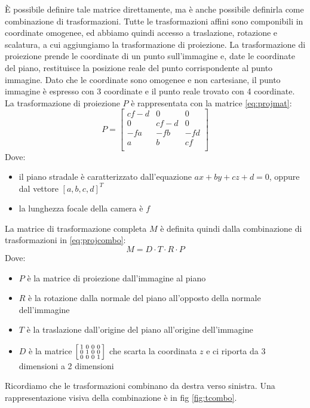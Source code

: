 È possibile definire tale matrice direttamente, ma è anche possibile definirla come combinazione di trasformazioni.
Tutte le trasformazioni affini sono componibili in coordinate omogenee, ed abbiamo quindi accesso a traslazione, rotazione e scalatura, a cui aggiungiamo la trasformazione di proiezione.
La trasformazione di proiezione prende le coordinate di un punto sull'immagine e, date le coordinate del piano, restituisce la posizione reale del punto corrispondente al punto immagine.
Dato che le coordinate sono omogenee e non cartesiane, il punto immagine è espresso con 3 coordinate e il punto reale trovato con 4 coordinate.
La trasformazione di proiezione $P$ è rappresentata con la matrice \ref{eq:projmat}:
\begin{equation}
        \label{eq:projmat}
        P = 
        \begin{bmatrix}
            cf - d & 0      & 0   \\
            0      & cf - d & 0   \\
            -fa    & -fb    & -fd \\
            a      & b      & cf  \\
        \end{bmatrix}
\end{equation}
Dove:
\begin{itemize}
    \item il piano stradale è caratterizzato dall'equazione $ax + by + cz + d = 0$, oppure dal vettore $[a, b, c, d]^T$
    \item la lunghezza focale della camera è $f$
\end{itemize}

La matrice di trasformazione completa $M$ è definita quindi dalla combinazione di trasformazioni in \ref{eq:projcombo}:
\begin{equation}
    \label{eq:projcombo}
    M = D \cdot T \cdot R \cdot P
\end{equation}
Dove:
\begin{itemize}
    \item $P$ è la matrice di proiezione dall'immagine al piano
    \item $R$ è la rotazione dalla normale del piano all'opposto della normale dell'immagine
    \item $T$ è la traslazione dall'origine del piano all'origine dell'immagine
    \item $D$ è la matrice 
    $
    \begin{bsmallmatrix}
        1 & 0 & 0 & 0 \\
        0 & 1 & 0 & 0 \\
        0 & 0 & 0 & 1 \\
    \end{bsmallmatrix}
    $
    che scarta la coordinata $z$ e ci riporta da 3 dimensioni a 2 dimensioni
\end{itemize}
Ricordiamo che le trasformazioni combinano da destra verso sinistra.
Una rappresentazione visiva della combinazione è in fig \ref{fig:tcombo}.

